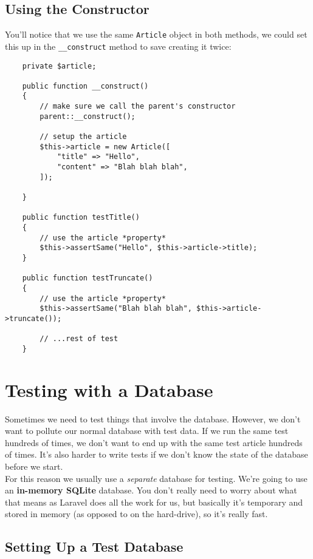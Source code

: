 \subsection{Using the Constructor}

You'll notice that we use the same \texttt{Article} object in both methods, we could set this up in the \texttt{\_\_construct} method to save creating it twice:

\begin{verbatim}
    private $article;

    public function __construct()
    {
        // make sure we call the parent's constructor
        parent::__construct();

        // setup the article
        $this->article = new Article([
            "title" => "Hello",
            "content" => "Blah blah blah",
        ]);

    }

    public function testTitle()
    {
        // use the article *property*
        $this->assertSame("Hello", $this->article->title);
    }

    public function testTruncate()
    {
        // use the article *property*
        $this->assertSame("Blah blah blah", $this->article->truncate());

        // ...rest of test
    }
\end{verbatim}


\section{Testing with a Database}

Sometimes we need to test things that involve the database. However, we don't want to pollute our normal database with test data. If we run the same test hundreds of times, we don't want to end up with the same test article hundreds of times. It's also harder to write tests if we don't know the state of the database before we start.
\\

For this reason we usually use a \textit{separate} database for testing. We're going to use an \textbf{in-memory SQLite} database. You don't really need to worry about what that means as Laravel does all the work for us, but basically it's temporary and stored in memory (as opposed to on the hard-drive), so it's really fast.


\pagebreak


\subsection{Setting Up a Test Database}


